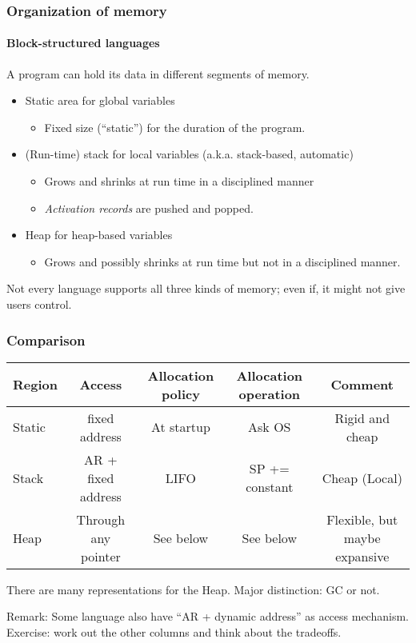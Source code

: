 \documentclass{beamer}
\begin{document}
\begin{frame}[fragile]
\frametitle{Organization of memory}
\framesubtitle{Block-structured languages}
A program can hold its data in different segments of memory.
\begin{itemize}
\item Static area for global variables
\begin{itemize}
\item Fixed size (``static'') for the duration of 
the program.
\end{itemize} 
\item (Run-time) stack for local variables (a.k.a. stack-based, automatic)
\begin{itemize}
\item  Grows and shrinks at run time in a disciplined
manner
\item  \emph{Activation records} are pushed and popped. 
\end{itemize}

\item Heap for heap-based variables
\begin{itemize}
\item Grows and possibly shrinks at run time but not
in a disciplined manner. 
\end{itemize}
\end{itemize}
Not every language supports all three kinds of memory; even if,
it might not give users control. 
\end{frame}


\begin{frame}[fragile]
\frametitle{Comparison}

{\tiny
\begin{tabular}{lcccc}
Region & Access        & Allocation policy & Allocation operation      & Comment \\
\hline 
Static & fixed address & At startup & Ask OS & Rigid and cheap \\
Stack  & AR + fixed address & LIFO & SP += constant & Cheap (Local) \\
Heap   & Through any pointer & See below & See below & Flexible, but maybe expansive \\
\hline 
\end{tabular}
}

There are many representations for the Heap. Major distinction: GC or not.

Remark: Some language also have ``AR + dynamic address'' as access mechanism.
Exercise: work out the other columns and think about the tradeoffs.

\end{frame}
\end{document}
